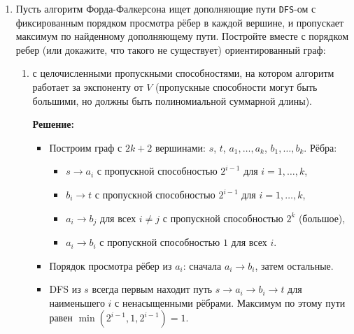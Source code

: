 \begin{enumerate}
\begin{itemize}
      \item Итого: стоимость минимального $s$-$t$ разреза в построенном графе равна $\min_x f(x) - \mathrm{const}$,
      где $\mathrm{const}$ --- сумма всех прибавленных констант.
      Граф содержит $n + 2$ вершины и $O(n^2)$ рёбер, все веса неотрицательны (за счёт $D_{ij} \ge 0$ и взятия максимумов с нулём).
    \end{itemize}

\subsection*{Дополнительные задачи}

  \item
    Пусть алгоритм Форда-Фалкерсона ищет дополняющие пути \texttt{DFS}-ом с фиксированным порядком
    просмотра рёбер в каждой вершине, и пропускает максимум по найденному дополняющему пути.
    Постройте вместе с порядком ребер (или докажите, что такого не существует) ориентированный граф:
    \begin{enumerate}
      \item
        с целочисленными пропускными способностями, на котором алгоритм работает за экспоненту от $V$
        (пропускные способности могут быть большими, но должны быть полиномиальной суммарной длины).

        \textbf{Решение:}

        \begin{itemize}
          \item Построим граф с $2k + 2$ вершинами: $s$, $t$, $a_1, \ldots, a_k$, $b_1, \ldots, b_k$.
          Рёбра:
          \begin{itemize}
            \item $s \to a_i$ с пропускной способностью $2^{i-1}$ для $i = 1, \ldots, k$,
            \item $b_i \to t$ с пропускной способностью $2^{i-1}$ для $i = 1, \ldots, k$,
            \item $a_i \to b_j$ для всех $i \ne j$ с пропускной способностью $2^k$ (большое),
            \item $a_i \to b_i$ с пропускной способностью $1$ для всех $i$.
          \end{itemize}

          \item Порядок просмотра рёбер из $a_i$: сначала $a_i \to b_i$, затем остальные.

          \item DFS из $s$ всегда первым находит путь $s \to a_i \to b_i \to t$ для наименьшего $i$ с ненасыщенными рёбрами. Максимум по этому пути равен $\min(2^{i-1}, 1, 2^{i-1}) = 1$.


\end{itemize}
\end{enumerate}
\end{enumerate}
